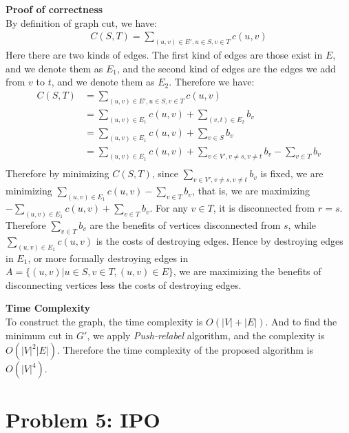 \documentclass{article}
\newcommand{\Complexity}{\vspace{0.3cm} \noindent\textbf{Time Complexity} \vspace{0.2cm} \\}
\newcommand{\Proof}{\vspace{0.3cm} \noindent\textbf{Proof of correctness} \vspace{0.2cm} \\}
\begin{document}
\Proof
By definition of graph cut, we have:
\begin{align}
  C(S, T) = \sum_{(u, v) \in E', u \in S, v\in T} c(u, v)
\end{align}
Here there are two kinds of edges. The first kind of edges are those exist in $E$, and we denote
them as $E_1$, and the second kind of edges are the edges we add from $v$ to $t$, and we denote them
as $E_2$. Therefore we have:
\begin{align}
  C(S, T) & = \sum_{(u, v) \in E', u \in S, v\in T} c(u, v) \\
  & = \sum_{(u, v) \in E_1} c(u, v) + \sum_{(v, t) \in E_2} b_v \\
  & = \sum_{(u, v) \in E_1} c(u, v) + \sum_{v \in S} b_v \\
  & = \sum_{(u, v) \in E_1} c(u, v) + \sum_{v \in V', v \neq s, v \neq t} b_v  - \sum_{v \in T} b_v \\
\end{align}
Therefore by minimizing $C(S, T)$, since $\sum_{v \in V', v \neq s, v \neq t} b_v$ is fixed,  
we are minimizing $ \sum_{(u, v) \in E_1} c(u, v) - \sum_{v \in T} b_v$, that is, we are maximizing 
$ -\sum_{(u, v) \in E_1} c(u, v) + \sum_{v \in T} b_v$. For any $v \in T$, it is disconnected from
$r = s$. Therefore $\sum_{v \in T} b_v$ are the benefits of vertices disconnected from $s$, while
$\sum_{(u, v) \in E_1} c(u, v)$ is the costs of destroying edges. Hence by destroying edges in 
$E_1$, or more formally destroying edges in  $A = \{(u, v) | u \in S, v\in T, (u, v) \in E\}$, we are
maximizing the benefits of disconnecting vertices less the costs of destroying edges.  

\Complexity
To construct the graph, the time complexity is $O(|V| + |E|)$. And to find the minimum cut in $G'$,
we apply \textit{Push-relabel} algorithm, and the complexity is $O(|V|^2|E|)$. Therefore the time
complexity of the proposed algorithm is $O(|V|^4)$.

\section*{Problem 5: IPO}
\end{document}
